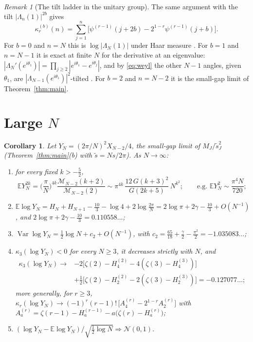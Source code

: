 \documentclass[12pt]{amsart}
\newtheorem{corollary}[theorem]{Corollary}
\theoremstyle{remark}
\newtheorem{remark}{Remark}
\newcommand{\E}{\mathbb{E}}
\newcommand{\1}{\mathbf{1}}
\DeclareMathOperator{\Var}{Var}
\begin{document}
\begin{remark}[The tilt ladder in the unitary group]\label{rem:ladder}
The same argument with the tilt $|\Lambda_n(1)|^{2b}$ gives
\begin{equation}\label{eq:ladder}
\kappa_r^{(b)}(n)=\sum_{j=1}^n\Big[\psi^{(r-1)}(j+2b)-2^{1-r}\psi^{(r-1)}(j+b)\Big].
\end{equation}
For $b=0$ and $n=N$ this is $\log|\Lambda_N(1)|$ under Haar measure
\cite{KS00}. For $b=1$ and $n=N-1$ it is exact at finite $N$ for the
derivative at an eigenvalue: $|\Lambda_N'(e^{i\theta_1})|=
\prod_{j\ge2}|e^{i\theta_1}-e^{i\theta_j}|$, and by \eqref{eq:weyl} the
other $N-1$ angles, given $\theta_1$, are $|\Lambda_{N-1}(e^{i\theta_1})|^2$-tilted
\cite{HKO00}. For $b=2$ and $n=N-2$ it is the small-gap limit of
Theorem~\ref{thm:main}.
\end{remark}

\section{Large $N$}\label{sec:largeN}

\begin{corollary}\label{cor:largeN}
Let $Y_N=(2\pi/N)^2X_{N-2}/4$, the small-gap limit of $M_J/\tilde s_J^2$
(Theorem~\ref{thm:main}(b) with $\tilde s=Ns/2\pi$). As $N\to\infty$:
\begin{enumerate}
\item[(a)] for every fixed $k>-\frac52$,
\[
\E Y_N^{2k}=\Big(\frac\pi N\Big)^{4k}\frac{\mathcal M_{N-2}(k+2)}{\mathcal M_{N-2}(2)}
\sim\pi^{4k}\,\frac{12\,G(k+3)^2}{G(2k+5)}\,N^{k^2};
\qquad\text{e.g. } \E Y_N^2\sim\frac{\pi^4N}{720};
\]
\item[(b)] $\E\log Y_N=H_N+H_{N+1}-\frac{10}3-\log4+2\log\frac{2\pi}N
=2\log\pi+2\gamma-\frac{10}3+O(N^{-1})$, and
$2\log\pi+2\gamma-\frac{10}3=0.110558\ldots$;
\item[(c)] $\Var\log Y_N=\frac12\log N+c_2+O(N^{-1})$, with
$c_2=\frac{65}{18}+\frac\gamma2-\frac{\pi^2}2=-1.035083\ldots$;
\item[(d)] $\kappa_3(\log Y_N)<0$ for every $N\ge3$, it decreases strictly
with $N$, and
\begin{align*}
\kappa_3(\log Y_N)\to{}&-2\big[\zeta(2)-H_4^{(2)}-4(\zeta(3)-H_4^{(3)})\big]\\
&+\tfrac12\big[\zeta(2)-H_2^{(2)}-2(\zeta(3)-H_2^{(3)})\big]=-0.127077\ldots;
\end{align*}
more generally, for $r\ge3$, $\kappa_r(\log Y_N)\to(-1)^r(r-1)!\,
\big[A_4^{(r)}-2^{1-r}A_2^{(r)}\big]$ with
$A_a^{(r)}=\zeta(r-1)-H_a^{(r-1)}-a\big(\zeta(r)-H_a^{(r)}\big)$;
\item[(e)] $(\log Y_N-\E\log Y_N)/\sqrt{\frac12\log N}\Rightarrow\mathcal N(0,1)$.
\end{enumerate}
\end{corollary}
\end{document}
